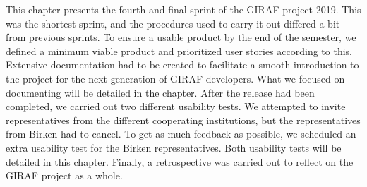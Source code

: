 This chapter presents the fourth and final sprint of the GIRAF project 2019.
This was the shortest sprint, and the procedures used to carry it out differed a bit from previous sprints.
To ensure a usable product by the end of the semester, we defined a minimum viable product and prioritized user stories according to this.
Extensive documentation had to be created to facilitate a smooth introduction to the project for the next generation of GIRAF developers.
What we focused on documenting will be detailed in the chapter. 
After the release had been completed, we carried out two different usability tests.
We attempted to invite representatives from the different cooperating institutions, but the representatives from Birken had to cancel.
To get as much feedback as possible, we scheduled an extra usability test for the Birken representatives.
Both usability tests will be detailed in this chapter. 
Finally, a retrospective was carried out to reflect on the GIRAF project as a whole.
